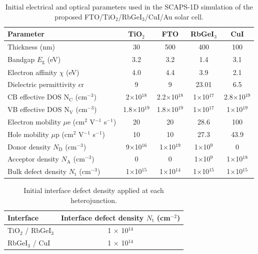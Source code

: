 \documentclass[11pt]{article}
\begin{document}
\begin{table}[htbp]
\centering
{\footnotesize\setlength{\tabcolsep}{3pt}
\begin{tabularx}{\textwidth}{Xcccc}
\hline
Parameter & TiO$_{2}$ & FTO & RbGeI$_{3}$ & CuI
\\\hline
Thickness (nm) & 30 & 500 & 400 & 100\\
Bandgap $E_{\mathrm{g}}$ (eV) & 3.2 & 3.2 & 1.4 & 3.1\\
Electron affinity $\chi$ (eV) & 4.0 & 4.4 & 3.9 & 2.1\\
Dielectric permittivity $\epsilon$r & 9 & 9 & 23.01 & 6.5\\
CB effective DOS N$_{\mathrm{C}}$ (cm$^{-3}$) & 2$\times$10$^{18}$ & 2.2$\times$10$^{18}$ & 1$\times$10$^{17}$ & 2.8$\times$10$^{19}$\\
VB effective DOS N$_{\mathrm{V}}$ (cm$^{-3}$) & 1.8$\times$10$^{19}$ & 1.8$\times$10$^{19}$ & 1$\times$10$^{17}$ & 1$\times$10$^{19}$\\
Electron mobility $\mu$e (cm$^{2}$ V$^{-1}$ s$^{-1}$) & 20 & 20 & 28.6 & 100\\
Hole mobility $\mu$p (cm$^{2}$ V$^{-1}$ s$^{-1}$) & 10 & 10 & 27.3 & 43.9\\
Donor density $N_{\mathrm{D}}$ (cm$^{-3}$) & 9$\times$10$^{16}$ & 1$\times$10$^{19}$ & 1$\times$10$^{9}$ & 0\\
Acceptor density $N_{\mathrm{A}}$ (cm$^{-3}$) & 0 & 0 & 1$\times$10$^{9}$ & 1$\times$10$^{18}$\\
Bulk defect density $N_{\mathrm{t}}$ (cm$^{-3}$) & 1$\times$10$^{15}$ & 1$\times$10$^{14}$ & 1$\times$10$^{15}$ & 1$\times$10$^{15}$\\
\hline
\end{tabularx}
}
\caption{Initial electrical and optical parameters used in the SCAPS-1D simulation of the proposed FTO/\allowbreak{}TiO$_{2}$/RbGeI$_{3}$/CuI/\allowbreak{}Au solar cell.}
\end{table}
\begin{table}[htbp]
\centering
{\small\setlength{\tabcolsep}{3pt}
\begin{tabularx}{\textwidth}{Xc}
\hline
Interface & Interface defect density $N_{\mathrm{t}}$ (cm$^{-2}$)
\\\hline
TiO$_{2}$ / RbGeI$_{3}$ & 1 $\times$ 10$^{14}$\\
RbGeI$_{3}$ / CuI & 1 $\times$ 10$^{14}$\\
\hline
\end{tabularx}
}
\caption{Initial interface defect density applied at each heterojunction.}
\end{table}
\end{document}
